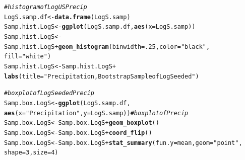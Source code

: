 \documentclass{article}\usepackage[]{graphicx}\usepackage[]{color}
\makeatletter
\newcommand{\hlnum}[1]{\textcolor[rgb]{0.686,0.059,0.569}{#1}}%
\newcommand{\hlstr}[1]{\textcolor[rgb]{0.192,0.494,0.8}{#1}}%
\newcommand{\hlcom}[1]{\textcolor[rgb]{0.678,0.584,0.686}{\textit{#1}}}%
\newcommand{\hlopt}[1]{\textcolor[rgb]{0,0,0}{#1}}%
\newcommand{\hlstd}[1]{\textcolor[rgb]{0.345,0.345,0.345}{#1}}%
\newcommand{\hlkwb}[1]{\textcolor[rgb]{0.69,0.353,0.396}{#1}}%
\newcommand{\hlkwc}[1]{\textcolor[rgb]{0.333,0.667,0.333}{#1}}%
\newcommand{\hlkwd}[1]{\textcolor[rgb]{0.737,0.353,0.396}{\textbf{#1}}}%
\newenvironment{kframe}{%
 \def\at@end@of@kframe{}%
 \ifinner\ifhmode%
  \def\at@end@of@kframe{\end{minipage}}%
  \begin{minipage}{\columnwidth}%
 \fi\fi%
 \def\FrameCommand##1{\hskip\@totalleftmargin \hskip-\fboxsep
 \colorbox{shadecolor}{##1}\hskip-\fboxsep
     \hskip-\linewidth \hskip-\@totalleftmargin \hskip\columnwidth}%
 \MakeFramed {\advance\hsize-\width
   \@totalleftmargin\z@ \linewidth\hsize
   \@setminipage}}%
 {\par\unskip\endMakeFramed%
 \at@end@of@kframe}
\newenvironment{knitrout}{}{} %
\makeatother
\begin{document}
\begin{knitrout}
\color{fgcolor}\begin{kframe}
\begin{alltt}
\hlcom{# histogram of LogUS Precip}
\hlstd{LogS.samp.df} \hlkwb{<-} \hlkwd{data.frame}\hlstd{(LogS.samp)}
\hlstd{Samp.hist.LogS} \hlkwb{<-} \hlkwd{ggplot}\hlstd{(LogS.samp.df,} \hlkwd{aes}\hlstd{(}\hlkwc{x} \hlstd{= LogS.samp))}
\hlstd{Samp.hist.LogS} \hlkwb{<-} \hlstd{Samp.hist.LogS} \hlopt{+} \hlkwd{geom_histogram}\hlstd{(}\hlkwc{binwidth} \hlstd{=} \hlnum{.25}\hlstd{,}\hlkwc{color} \hlstd{=} \hlstr{"black"}\hlstd{,}
                                            \hlkwc{fill} \hlstd{=} \hlstr{"white"}\hlstd{)}
\hlstd{Samp.hist.LogS} \hlkwb{<-} \hlstd{Samp.hist.LogS} \hlopt{+}
  \hlkwd{labs}\hlstd{(}\hlkwc{title} \hlstd{=} \hlstr{"Precipitation, Bootstrap Sample of Log Seeded"}\hlstd{)}

\hlcom{# boxplot of Log Seeded Precip}
\hlstd{Samp.box.LogS} \hlkwb{<-} \hlkwd{ggplot}\hlstd{(LogS.samp.df,}
                        \hlkwd{aes}\hlstd{(}\hlkwc{x} \hlstd{=} \hlstr{"Precipitation"}\hlstd{,}\hlkwc{y} \hlstd{= LogS.samp))} \hlcom{# boxplot of Precip}
\hlstd{Samp.box.LogS} \hlkwb{<-} \hlstd{Samp.box.LogS} \hlopt{+} \hlkwd{geom_boxplot}\hlstd{()}
\hlstd{Samp.box.LogS} \hlkwb{<-} \hlstd{Samp.box.LogS} \hlopt{+} \hlkwd{coord_flip}\hlstd{()}
\hlstd{Samp.box.LogS} \hlkwb{<-} \hlstd{Samp.box.LogS} \hlopt{+} \hlkwd{stat_summary}\hlstd{(}\hlkwc{fun.y} \hlstd{= mean,} \hlkwc{geom} \hlstd{=} \hlstr{"point"}\hlstd{,}
                                        \hlkwc{shape} \hlstd{=} \hlnum{3}\hlstd{,} \hlkwc{size} \hlstd{=} \hlnum{4}\hlstd{)}
\end{alltt}
\end{kframe}
\end{knitrout}
\end{document}
